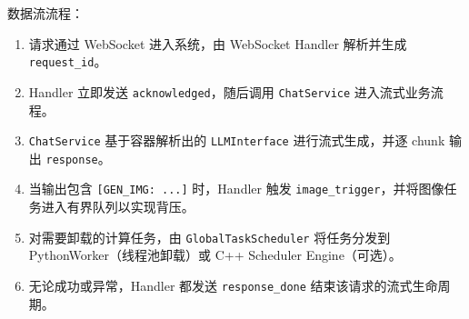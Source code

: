 \documentclass[a4paper,12pt]{article}
\begin{document}
数据流流程：
\begin{enumerate}
    \item 请求通过 WebSocket 进入系统，由 WebSocket Handler 解析并生成 \texttt{request\_id}。
    \item Handler 立即发送 \texttt{acknowledged}，随后调用 \texttt{ChatService} 进入流式业务流程。
    \item \texttt{ChatService} 基于容器解析出的 \texttt{LLMInterface} 进行流式生成，并逐 chunk 输出 \texttt{response}。
    \item 当输出包含 \texttt{[GEN\_IMG: ...]} 时，Handler 触发 \texttt{image\_trigger}，并将图像任务进入有界队列以实现背压。
    \item 对需要卸载的计算任务，由 \texttt{GlobalTaskScheduler} 将任务分发到 PythonWorker（线程池卸载）或 C++ Scheduler Engine（可选）。
    \item 无论成功或异常，Handler 都发送 \texttt{response\_done} 结束该请求的流式生命周期。
\end{enumerate}
\end{document}
